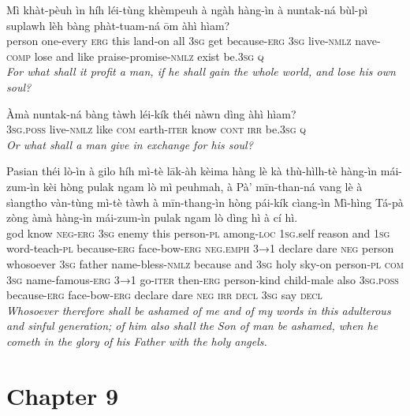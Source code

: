 \documentclass[11pt,a4paper]{article}
\begin{document}
\begin{exe}
\gll Mì khàt-pèuh ìn híh léi-tùng khèmpeuh à ngàh hàng-ìn à nuntak-ná bùl-pì suplawh lèh bàng phàt-tuam-ná ōm àhì hìam? \\
     person one-every \textsc{erg} this land-on all \textsc{3sg} get because-\textsc{erg} \textsc{3sg} live-\textsc{nmlz} nave-\textsc{comp} lose and like praise-promise-\textsc{nmlz} exist be.\textsc{3sg} \textsc{q} \\
\glt \textcolor{kjvcolor}{\textit{For what shall it profit a man, if he shall gain the whole world, and lose his own soul?}}

\gll Àmà nuntak-ná bàng tàwh léi-kík théi nàwn dìng àhì hìam? \\
     \textsc{3sg}.\textsc{poss} live-\textsc{nmlz} like \textsc{com} earth-\textsc{iter} know \textsc{cont} \textsc{irr} be.\textsc{3sg} \textsc{q} \\
\glt \textcolor{kjvcolor}{\textit{Or what shall a man give in exchange for his soul?}}

\gll Pasian théi lò-ìn à gilo híh mì-tè lāk-àh kèima hàng lè kà thù-hìlh-tè hàng-ìn mái-zum-ìn kèi hòng pulak ngam lò mì peuhmah, à Pà' mīn-than-ná vang lè à sìangtho vàn-tùng mì-tè tàwh à mīn-thang-ìn hòng pái-kík cìang-ìn Mì-hìng Tá-pà zòng àmà hàng-ìn mái-zum-ìn pulak ngam lò dìng hì à cí hì. \\
     god know \textsc{neg}-\textsc{erg} \textsc{3sg} enemy this person-\textsc{pl} among-\textsc{loc} \textsc{1sg}.self reason and \textsc{1sg} word-teach-\textsc{pl} because-\textsc{erg} face-bow-\textsc{erg} \textsc{neg}.\textsc{emph} \textsc{3→1} declare dare \textsc{neg} person whosoever \textsc{3sg} father name-bless-\textsc{nmlz} because and \textsc{3sg} holy sky-on person-\textsc{pl} \textsc{com} \textsc{3sg} name-famous-\textsc{erg} \textsc{3→1} go-\textsc{iter} then-\textsc{erg} person-kind child-male also \textsc{3sg}.\textsc{poss} because-\textsc{erg} face-bow-\textsc{erg} declare dare \textsc{neg} \textsc{irr} \textsc{decl} \textsc{3sg} say \textsc{decl} \\
\glt \textcolor{kjvcolor}{\textit{Whosoever therefore shall be ashamed of me and of my words in this adulterous and sinful generation; of him also shall the Son of man be ashamed, when he cometh in the glory of his Father with the holy angels.}}

\end{exe}
\newpage

\section*{Chapter 9}
\end{document}
